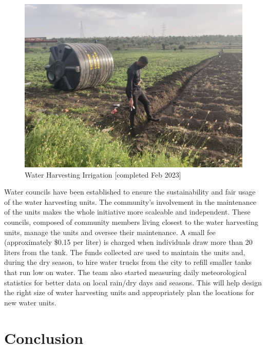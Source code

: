 \documentclass[10pt, twocolumn]{article}
\begin{document}
\begin{figure}
    \centering
    \includegraphics[width=1\linewidth]{photos/Irrigation_Unit.jpg}
    \caption{Water Harvesting Irrigation [completed Feb 2023]}
    \label{fig:irrigation_unit}
\end{figure}

Water councils have been established to ensure the sustainability and fair usage of the water harvesting units. The community's involvement in the maintenance of the units makes the whole initiative more scaleable and independent. These councils, composed of community members living closest to the water harvesting units, manage the units and oversee their maintenance. A small fee (approximately \$0.15 per liter) is charged when individuals draw more than 20 liters from the tank. The funds collected are used to maintain the units and, during the dry season, to hire water trucks from the city to refill smaller tanks that run low on water. The team also started measuring daily meteorological statistics for better data on local rain/dry days and seasons. This will help design the right size of water harvesting units and appropriately plan the locations for new water units.


















\section{Conclusion}
\end{document}
